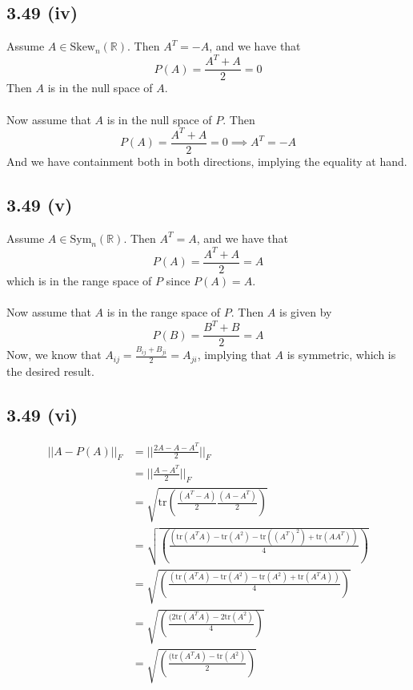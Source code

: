 \documentclass[letterpaper,12pt]{article}
\theoremstyle{definition}
\begin{document}
\subsection*{3.49 (iv)}
Assume $A \in \text{Skew}_n(\mathbb{R})$.
Then $A^T = -A$, and we have that
\[P(A) = \frac{A^T + A}{2} = 0\]
Then $A$ is in the null space of $A$.
\\\\
Now assume that $A$ is in the null space of $P$. Then
\[P(A) = \frac{A^T + A}{2} = 0 \implies A^T = -A\]
And we have containment both in both directions, implying the equality at hand.

\subsection*{3.49 (v)}
Assume $A \in \text{Sym}_n(\mathbb{R})$. Then $A^T = A$, and we have that 
\[P(A) = \frac{A^T + A}{2} = A\] which is in the range space of $P$ since $P(A) = A$. \\\\
Now assume that $A$ is in the range space of $P$. Then $A$ is given by
\[P(B) = \frac{B^T + B}{2} = A\]
Now, we know that $A_{ij} = \frac{B_{ij} + B_{ji}}{2} = A_{ji}$, implying that $A$ is symmetric, which is the desired result.

\subsection*{3.49 (vi)}
\begin{align*}
    ||A - P(A)||_F &= ||\frac{2A - A - A^T}{2}||_F\\ &= ||\frac{A - A^T}{2}||_F\\ 
    &= \sqrt{\text{tr} \left( \frac{(A^T-A)}{2}\frac{(A-A^T)}{2} \right)}\\
    &= \sqrt{ \left( \frac{(\text{tr}(A^TA) - \text{tr}(A^2) - \text{tr}((A^T)^2) + \text{tr}(AA^T))}{4} \right)}\\
    &= \sqrt{ \left( \frac{(\text{tr}(A^TA) - \text{tr}(A^2) - \text{tr}(A^2) + \text{tr}(A^TA))}{4} \right)}\\
    &= \sqrt{ \left( \frac{(2\text{tr}(A^TA) - 2\text{tr}(A^2)}{4} \right)}\\
    &= \sqrt{ \left( \frac{(\text{tr}(A^TA) - \text{tr}(A^2)}{2} \right)}\\
\end{align*}
\end{document}
